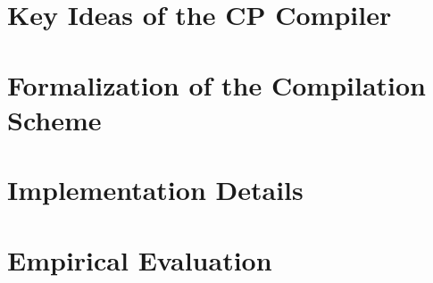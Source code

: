 \chapter{Key Ideas of the CP Compiler} \label{ch:key}

\chapter{Formalization of the Compilation Scheme} \label{ch:calculi}

\chapter{Implementation Details} \label{ch:compilation}

\chapter{Empirical Evaluation} \label{ch:empirical}

